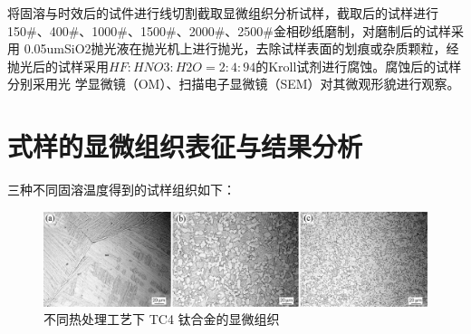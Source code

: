 将固溶与时效后的试件进行线切割截取显微组织分析试样，截取后的试样进行 150\#、400\#、1000\#、1500\#、2000\#、2500\#金相砂纸磨制，对磨制后的试样采用 0.05umSiO2抛光液在抛光机上进行抛光，去除试样表面的划痕或杂质颗粒，经抛光后的试样采用$ HF:HNO3:H2O=2:4:94 $的Kroll试剂进行腐蚀。腐蚀后的试样分别采用光 学显微镜（OM）、扫描电子显微镜（SEM）对其微观形貌进行观察。

\section{式样的显微组织表征与结果分析}
三种不同固溶温度得到的试样组织如下：
\begin{figure}[h!]
	\centering
	\includegraphics[width=0.7\linewidth]{pic/demo-mico}
	\caption{不同热处理工艺下 TC4 钛合金的显微组织}
	\label{fig:demo-mico}
\end{figure}